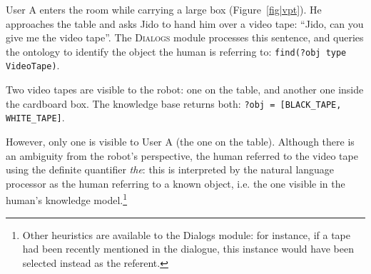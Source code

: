 \documentclass[preprint,3p,times]{elsarticle}
\newcommand{\concept}[1]{{\small \texttt{#1}}}
\newcommand{\ie}{i.e.\xspace}
\begin{document}
User A enters the room while carrying a large box (Figure~\ref{fig|vpt}). He
approaches the table and asks Jido to hand him over a video tape: ``Jido, can
you give me the video tape''. The \textsc{Dialogs} module processes this
sentence, and queries the ontology to
identify the object the human is referring to: \concept{find(?obj type
VideoTape)}. 

Two video tapes are visible to the robot: one on the table, and another one
inside the cardboard box. The knowledge base returns both: 
\concept{?obj = [BLACK\_TAPE, WHITE\_TAPE]}. 

However, only one is visible to User A (the one on the table). Although there is
an ambiguity from the robot's perspective, the human referred to the video tape using
the definite quantifier \emph{the}: this is interpreted by the natural language
processor as the human referring to a known object, \ie the one visible in the
human's knowledge model.\footnote{Other heuristics are available to the {\sc Dialogs} module: for
instance, if a tape had been recently mentioned in the dialogue, this instance
would have been selected instead as the referent.}
\end{document}
